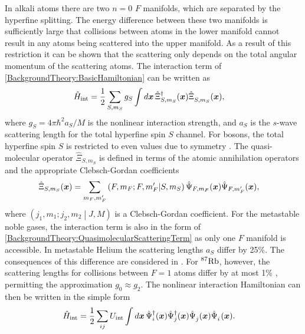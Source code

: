 In alkali atoms there are two $n=0$ $F$ manifolds, which are separated by the hyperfine splitting.  The energy difference between these two manifolds is sufficiently large that collisions between atoms in the lower manifold cannot result in any atoms being scattered into the upper manifold.  As a result of this restriction it can be shown \citep{Ho:1998} that the scattering only depends on the total angular momentum of the scattering atoms.  The interaction term of \eqref{BackgroundTheory:BasicHamiltonian} can be written as
\begin{align}
    \label{BackgroundTheory:QuasimolecularScatteringTerm}
    \hat{H}_\text{int} &= \frac{1}{2}\sum_{S, m_S}  g_S \int d \vect{x}\, \hat{\Xi}^\dagger_{S, m_S}(\vect{x}) \hat{\Xi}^{\phantom{\dagger}}_{S, m_S}(\vect{x}),
\end{align}
where $g_S = 4 \pi \hbar^2 a_S/M$ is the nonlinear interaction strength, and $a_S$ is the $s$-wave scattering length for the total hyperfine spin $S$ channel.  For bosons, the total hyperfine spin $S$ is restricted to even values due to symmetry \citep{Ho:1998}.  The quasi-molecular operator $\hat{\Xi}_{S, m_S}$ is defined in terms of the atomic annihilation operators and the appropriate Clebsch-Gordan coefficients~\citep{Ho:1998}
\begin{align}
    \hat{\Xi}_{S, m_S}(\bm{x}) &= \sum_{m_F, m_F'} \left(F, m_F; F, m_F' \middle| S, m_S \right) \hat{\Psi}_{F, m_F}(\bm{x}) \hat{\Psi}_{F, m_F'}(\bm{x}),
\end{align}
where $\left(j_1, m_1; j_2, m_2 \middle| J, M\right)$ is a Clebsch-Gordan coefficient.  For the metastable noble gases, the interaction term is also in the form of \eqref{BackgroundTheory:QuasimolecularScatteringTerm} as only one $F$ manifold is accessible.  In metastable Helium the scattering lengths $a_S$ differ by 25\%.  The consequences of this difference are considered in .  For $^{87}\text{Rb}$, however, the scattering lengths for collisions between $F=1$ atoms differ by at most 1\% \citep{Kempen:2002}, permitting the approximation $g_0 \approx g_2$.  The nonlinear interaction Hamiltonian can then be written in the simple form
\begin{align}
    \label{BackgroundTheory:SimpleScattering}
    \hat{H}_\text{int} &= \frac{1}{2} \sum_{ij} U_\text{int} \int d \vect{x}\, \hat{\Psi}_i^\dagger(\vect{x}) \hat{\Psi}_j^\dagger(\vect{x}) \hat{\Psi}_j^{\phantom{\dagger}}(\vect{x}) \hat{\Psi}_i^{\phantom{\dagger}}(\vect{x}).
\end{align}

